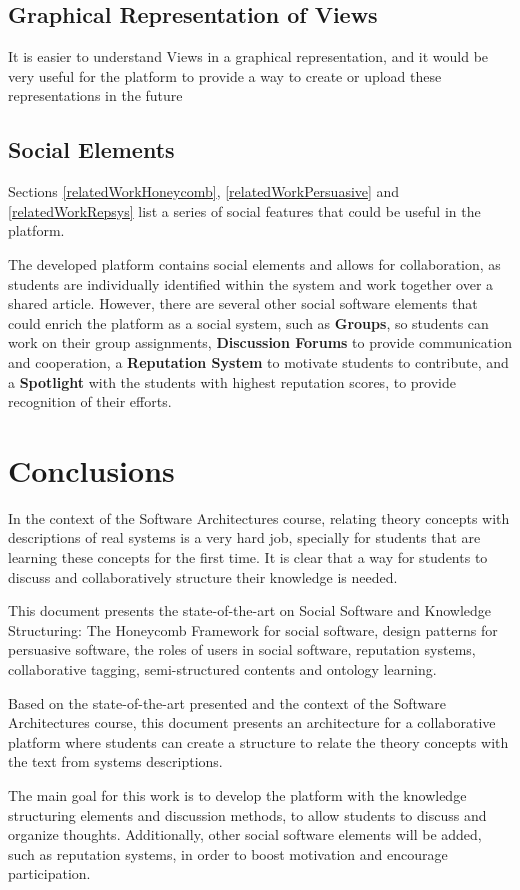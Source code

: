 \documentclass[conference]{IEEEtran}
\begin{document}
\subsection{Graphical Representation of Views}
It is easier to understand Views in a graphical representation, and it would be very useful for the platform to provide a way to create or upload these representations in the future

\subsection{Social Elements}
Sections \ref{relatedWorkHoneycomb}, \ref{relatedWorkPersuasive} and  \ref{relatedWorkRepsys} list a series of social features that could be useful in the platform.

The developed platform contains social elements and allows for collaboration, as students are individually identified within the system and work together over a shared article. However, there are several other social software elements that could enrich the platform as a social system, such as \textbf{Groups}, so students can work on their group assignments, \textbf{Discussion Forums} to provide communication and cooperation, a \textbf{Reputation System} to motivate students to contribute, and a \textbf{Spotlight} with the students with highest reputation scores, to provide recognition of their efforts.

\section{Conclusions}

In the context of the Software Architectures course, relating theory concepts with descriptions of real systems is a very hard job, specially for students that are learning these concepts for the first time. It is clear that a way for students to discuss and collaboratively structure their knowledge is needed.

This document presents the state-of-the-art on Social Software and Knowledge Structuring: The Honeycomb Framework for social software, design patterns for persuasive software, the roles of users in social software, reputation systems, collaborative tagging, semi-structured contents and ontology learning.

Based on the state-of-the-art presented and the context of the Software Architectures course, this document presents an architecture for a collaborative platform where students can create a structure to relate the theory concepts with the text from systems descriptions.

The main goal for this work is to develop the platform with the knowledge structuring elements and discussion methods, to allow students to discuss and organize thoughts. Additionally, other social software elements will be added, such as reputation systems, in order to boost motivation and encourage participation. 

  
  

\end{document}
